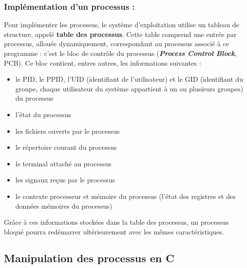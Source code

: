 		\subsubsection*{Implémentation d'un processus :}
			Pour implémenter les processus, le système d'exploitation utilise un tableau de structure, appelé \textbf{table des processus}. Cette table comprend une entrée par processus, allouée dynamiquement, correspondant au processus associé à ce programme : c'est le bloc de contrôle du processus (\textbf{\textit{Process Control Block}}, PCB). Ce bloc contient, entres autres, les informations suivantes :
			\begin{itemize}
				\item le PID, le PPID, l'UID (identifiant de l'utilisateur) et le GID (identifiant du groupe, chaque utilisateur du système appartient à un ou plusieurs groupes) du processus
				\item l'état du processus
				\item les fichiers ouverts par le processus
				\item le répertoire courant du processus
				\item le terminal attaché au processus
				\item les signaux reçus par le processus
				\item le contexte processeur et mémoire du processus (l'état des registres et des données mémoires du processus)
			\end{itemize}
			Grâce à ces informations stockées dans la table des processus, un processus bloqué pourra redémarrer ultérieurement avec les mêmes caractéristiques.
			
			
	\subsection{Manipulation des processus en C}
